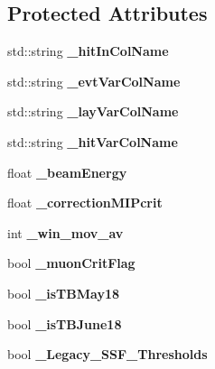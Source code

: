 \subsection*{Protected Attributes}
\begin{DoxyCompactItemize}
\item 
std\-::string {\bfseries \-\_\-hit\-In\-Col\-Name}\label{classCALICE_1_1ShowerStartFindingProcessor_a9c50821b58ba551c15361bfae4c240ef}

\item 
std\-::string {\bfseries \-\_\-evt\-Var\-Col\-Name}\label{classCALICE_1_1ShowerStartFindingProcessor_a5cfc455dcb59c246607ed5b0dfce5c75}

\item 
std\-::string {\bfseries \-\_\-lay\-Var\-Col\-Name}\label{classCALICE_1_1ShowerStartFindingProcessor_a58c3524ed8a79759488b0d98358a94ab}

\item 
std\-::string {\bfseries \-\_\-hit\-Var\-Col\-Name}\label{classCALICE_1_1ShowerStartFindingProcessor_a0eee5d368488730f3589e961330711a7}

\item 
float {\bfseries \-\_\-beam\-Energy}\label{classCALICE_1_1ShowerStartFindingProcessor_ae456e97022ca26ff92197c9565ada3bd}

\item 
float {\bfseries \-\_\-correction\-M\-I\-Pcrit}\label{classCALICE_1_1ShowerStartFindingProcessor_a6b7b733b0f842427753dd67cb88289a4}

\item 
int {\bfseries \-\_\-win\-\_\-mov\-\_\-av}\label{classCALICE_1_1ShowerStartFindingProcessor_ab0330e51ef694eeb9a30224ad0f3ac57}

\item 
bool {\bfseries \-\_\-muon\-Crit\-Flag}\label{classCALICE_1_1ShowerStartFindingProcessor_afa13e374ba8199edcd6532fa5f275b67}

\item 
bool {\bfseries \-\_\-is\-T\-B\-May18}\label{classCALICE_1_1ShowerStartFindingProcessor_a254c351165697fa527745ce22b6f9f6b}

\item 
bool {\bfseries \-\_\-is\-T\-B\-June18}\label{classCALICE_1_1ShowerStartFindingProcessor_a6a5e06076b811969435484f48cca68d6}

\item 
bool {\bfseries \-\_\-\-Legacy\-\_\-\-S\-S\-F\-\_\-\-Thresholds}\label{classCALICE_1_1ShowerStartFindingProcessor_a381c0af0673aa5b3036ec4de30185a08}


\end{DoxyCompactItemize}
